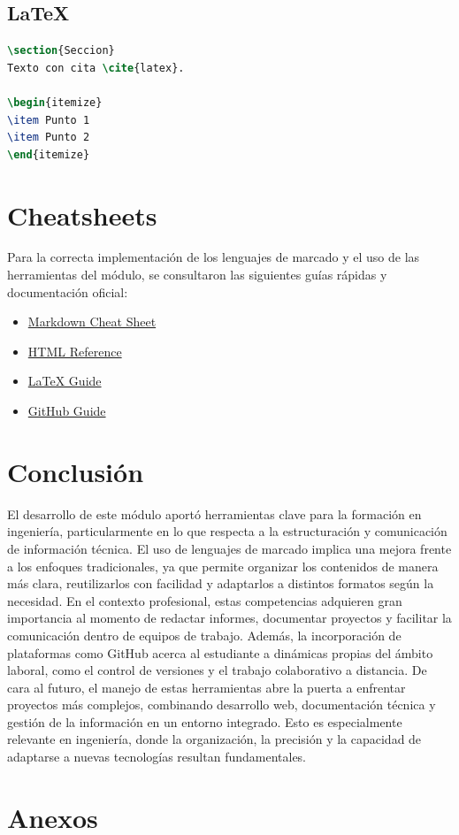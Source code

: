 \documentclass[runningheads]{llncs}
\begin{document}
\subsection{LaTeX}
\begin{lstlisting}[language=TeX, caption=Ejemplo LaTeX]
\section{Seccion}
Texto con cita \cite{latex}.

\begin{itemize}
\item Punto 1
\item Punto 2
\end{itemize}
\end{lstlisting}

\section{Cheatsheets}

Para la correcta implementación de los lenguajes de marcado y el uso de las herramientas del módulo, se consultaron las siguientes guías rápidas y documentación oficial:

\begin{itemize}
\item \href{https://www.markdownguide.org/cheat-sheet/}{Markdown Cheat Sheet} \cite{markdown}
\item \href{https://www.w3schools.com}{HTML Reference} \cite{html}
\item \href{https://www.overleaf.com/learn}{LaTeX Guide} \cite{latex}
\item \href{https://education.github.com}{GitHub Guide} \cite{git}
\end{itemize}

\section{Conclusión}
El desarrollo de este módulo aportó herramientas clave para la formación en ingeniería, particularmente en lo que respecta a la estructuración y comunicación de información técnica. El uso de lenguajes de marcado implica una mejora frente a los enfoques tradicionales, ya que permite organizar los contenidos de manera más clara, reutilizarlos con facilidad y adaptarlos a distintos formatos según la necesidad.
En el contexto profesional, estas competencias adquieren gran importancia al momento de redactar informes, documentar proyectos y facilitar la comunicación dentro de equipos de trabajo. Además, la incorporación de plataformas como GitHub acerca al estudiante a dinámicas propias del ámbito laboral, como el control de versiones y el trabajo colaborativo a distancia.
De cara al futuro, el manejo de estas herramientas abre la puerta a enfrentar proyectos más complejos, combinando desarrollo web, documentación técnica y gestión de la información en un entorno integrado. Esto es especialmente relevante en ingeniería, donde la organización, la precisión y la capacidad de adaptarse a nuevas tecnologías resultan fundamentales.

\section{Anexos}





\end{document}
